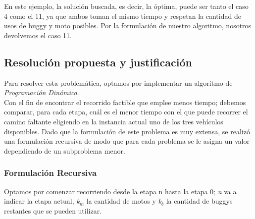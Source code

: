 En este ejemplo, la soluci\'on buscada, es decir, la \'optima, puede ser tanto el caso 4 como el 11, ya que ambos toman el mismo tiempo y respetan la cantidad de usos de buggy y moto posibles.
Por la formulaci\'on de nuestro algoritmo, nosotros devolvemos el caso 11.



\newpage
\subsection{Resoluci\'on propuesta y justificaci\'on}

Para resolver esta problem\'atica, optamos por implementar un algoritmo de \emph{Programaci\'on Din\'amica}.\\

Con el fin de encontrar el recorrido factible que emplee menos tiempo; debemos comparar, para cada etapa, cu\'al es el menor tiempo con el que puede recorrer el camino faltante eligiendo en la instancia actual uno de los tres veh\'iculos disponibles. Dado que la formulaci\'on de este problema es muy extensa, se realiz\'o una formulaci\'on recursiva de modo que para cada problema se le asigna un valor dependiendo de un subproblema menor. 

\subsubsection*{Formulaci\'on Recursiva}

Optamos por comenzar recorriendo desde la etapa n hasta la etapa 0; \emph{n} va a indicar la etapa actual, \emph{k$_m$} la cantidad de motos y \emph{k$_b$} la cantidad de buggys restantes que se pueden utilizar.

